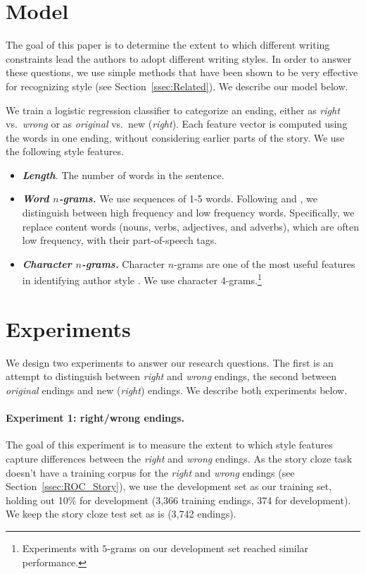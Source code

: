 \documentclass[11pt,a4paper]{article}
\newcommand{\secref}[1]{Section~\ref{ssec:#1}}
\newcommand{\isectionb}[1]{\section{#1}\label{ssec:#1}}
\newcommand{\roy}[1]{{\color{orange}\textsc{[#1 --rs]}}}
\renewcommand{\roy}[1]{{\color{orange}[#1 --rs]}}
\renewcommand{\roy}[1]{#1}
\begin{document}
\isectionb{Model}

The goal of this paper is to determine the extent to which 
different writing constraints lead the authors to adopt different writing styles. 
In order to answer these questions, we use simple methods that have been shown to be very effective for recognizing style (see \secref{Related}).
We describe our model below.

We train a logistic regression classifier to categorize an ending,
either as {\it right} vs.~{\it wrong} or as {\it original} vs.~new ({\it right}).
Each feature vector is computed using the words in one ending, without considering earlier parts of the story. 
We use the following style features.

\begin{itemize}
\item\textit{\textbf{Length}.} The number of words in the sentence.
\item\textit{\textbf{Word $n$-grams.}} We use sequences of 1-5
  words. Following \citet{Tsur:2010} and \citet{Schwartz:2013}, we distinguish between high frequency and low frequency words. 
Specifically, we replace content words (nouns, verbs, adjectives, and adverbs), which are often low frequency, with their part-of-speech tags.
\item\textit{\textbf{Character $n$-grams.}} Character $n$-grams are one of the most useful features in identifying author style \cite{Stamatatos:2009}. 
We use character $4$-grams.\footnote{\roy{Experiments with $5$-grams on our development set reached similar performance.}}
\end{itemize}

\isectionb{Experiments}
We design two experiments to answer our research questions. 
The first is an attempt to distinguish between {\it right} and {\it wrong} endings,
the second  between {\it original} endings and new ({\it right}) endings.
We describe both experiments below.

\paragraph{Experiment 1: right/wrong endings.}
The goal of this experiment is to measure the extent to which  style features capture differences between the {\it right} and {\it wrong} endings.
As the story cloze task doesn't have a training corpus for the {\it
  right} and {\it wrong} endings (see \secref{ROC_Story}), we use the
development set as our training set, holding out 10\% for development
(3,366 training endings, 374 for development). 
 We keep the story cloze test set as is (3,742 endings).
\end{document}
